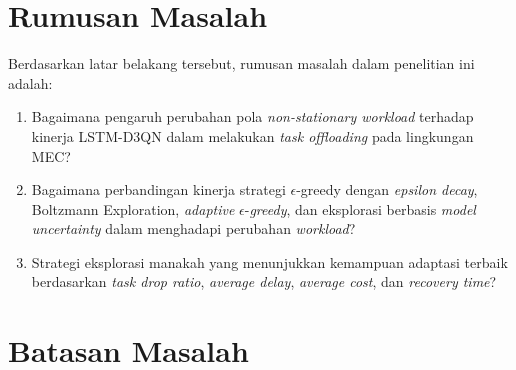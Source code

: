\vspace{1cm}
\section{Rumusan Masalah}
\label{sec:rumusan_masalah}

Berdasarkan latar belakang tersebut, rumusan masalah dalam penelitian ini adalah:
\begin{enumerate}[leftmargin=*, noitemsep, topsep=0.3ex]
	\item Bagaimana pengaruh perubahan pola \textit{non-stationary workload} terhadap kinerja LSTM-D3QN dalam melakukan \textit{task offloading} pada lingkungan MEC?
	\item Bagaimana perbandingan kinerja strategi $\epsilon$-greedy dengan \textit{epsilon decay}, Boltzmann Exploration, \textit{adaptive} $\epsilon$-\textit{greedy}, dan eksplorasi berbasis \textit{model uncertainty} dalam menghadapi perubahan \textit{workload}?
	\item Strategi eksplorasi manakah yang menunjukkan kemampuan adaptasi terbaik berdasarkan \textit{task drop ratio}, \textit{average delay}, \textit{average cost}, dan \textit{recovery time}?
\end{enumerate}

\vspace{1cm}
\section{Batasan Masalah}
\label{sec:batasan_masalah}

